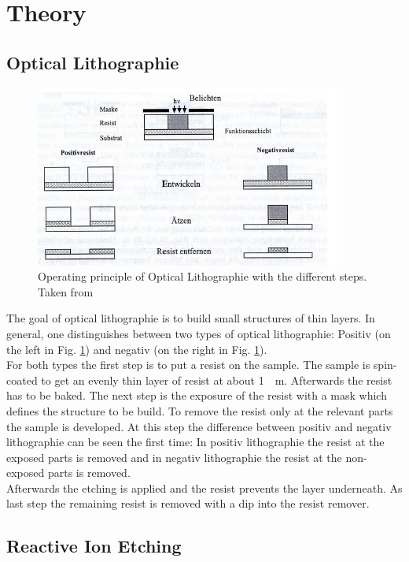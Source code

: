 \documentclass[%
 reprint,
amsmath,amssymb,
pra,
]{revtex4-1}
\begin{document}
\section{Theory}

\subsection{Optical Lithographie}

\begin{figure}
\centering
\includegraphics[scale=1.0]{Bilder/Lithographie.PNG}
\caption{Operating principle of Optical Lithographie with the different steps. Taken from \cite{Volklein00}}
\label{fig:Lithographie}
\end{figure}

The goal of optical lithographie is to build small structures of thin layers. In general, one distinguishes between two types of optical lithographie: Positiv (on the left in Fig. \ref{fig:Lithographie}) and negativ (on the right in Fig. \ref{fig:Lithographie}). \\
For both types the first step is to put a resist on the sample. The sample is spin-coated to get an evenly thin layer of resist at about \SI{1}{\mu m}. Afterwards the resist has to be baked. The next step is the exposure of the resist with a mask which defines the structure to be build. To remove the resist only at the relevant parts the sample is developed. At this step the difference between positiv and negativ lithographie can be seen the first time: In positiv lithographie the resist at the exposed parts is removed and in negativ lithographie the resist at the non-exposed parts is removed. \\
Afterwards the etching is applied and the resist prevents the layer underneath. As last step the remaining resist is removed with a dip into the resist remover.


\subsection{Reactive Ion Etching}
\end{document}
